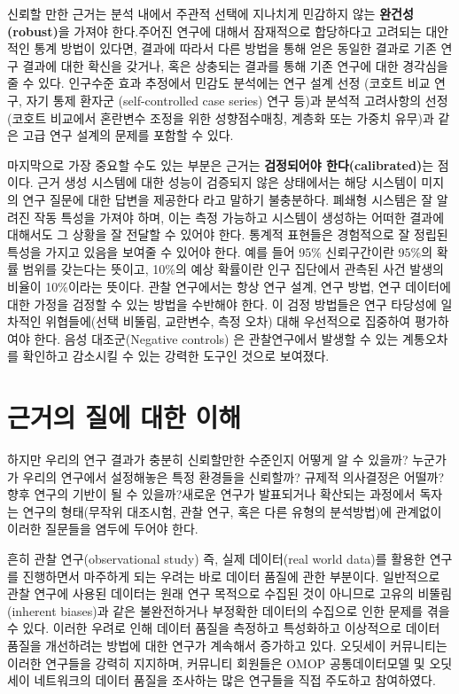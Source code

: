 \documentclass[11pt]{book}
\theoremstyle{definition}
\theoremstyle{definition}
\theoremstyle{definition}
\theoremstyle{remark}
\begin{document}
신뢰할 만한 근거는 분석 내에서 주관적 선택에 지나치게 민감하지 않는
\textbf{완건성(robust)}을 가져야 한다.주어진 연구에 대해서 잠재적으로
합당하다고 고려되는 대안적인 통계 방법이 있다면, 결과에 따라서 다른
방법을 통해 얻은 동일한 결과로 기존 연구 결과에 대한 확신을 갖거나, 혹은
상충되는 결과를 통해 기존 연구에 대한 경각심을 줄 수 있다.
\citep{madigan2013design} 인구수준 효과 추정에서 민감도 분석에는 연구
설계 선정 (코호트 비교 연구, 자기 통제 환자군 (self-controlled case
series) 연구 등)과 분석적 고려사항의 선정 (코호트 비교에서 혼란변수
조정을 위한 성향점수매칭, 계층화 또는 가중치 유무)과 같은 고급 연구
설계의 문제를 포함할 수 있다.

마지막으로 가장 중요할 수도 있는 부분은 근거는 \textbf{검정되어야
한다(calibrated)}는 점이다. 근거 생성 시스템에 대한 성능이 검증되지 않은
상태에서는 해당 시스템이 미지의 연구 질문에 대한 답변을 제공한다 라고
말하기 불충분하다. 폐쇄형 시스템은 잘 알려진 작동 특성을 가져야 하며,
이는 측정 가능하고 시스템이 생성하는 어떠한 결과에 대해서도 그 상황을 잘
전달할 수 있어야 한다. 통계적 표현들은 경험적으로 잘 정립된 특성을
가지고 있음을 보여줄 수 있어야 한다. 예를 들어 95\% 신뢰구간이란 95\%의
확률 범위를 갖는다는 뜻이고, 10\%의 예상 확률이란 인구 집단에서 관측된
사건 발생의 비율이 10\%이라는 뜻이다. 관찰 연구에서는 항상 연구 설계,
연구 방법, 연구 데이터에 대한 가정을 검정할 수 있는 방법을 수반해야
한다. 이 검정 방법들은 연구 타당성에 일차적인 위협들에(선택 비뚤림,
교란변수, 측정 오차) 대해 우선적으로 집중하여 평가하여야 한다. 음성
대조군(Negative controls) 은 관찰연구에서 발생할 수 있는 계통오차를
확인하고 감소시킬 수 있는 강력한 도구인 것으로 보여졌다.
\citep{schuemie_2016, schuemie_2018, schuemie_2018b}

\section{근거의 질에 대한 이해}\label{---}

하지만 우리의 연구 결과가 충분히 신뢰할만한 수준인지 어떻게 알 수
있을까? 누군가가 우리의 연구에서 설정해놓은 특정 환경들을 신뢰할까?
규제적 의사결정은 어떨까? 향후 연구의 기반이 될 수 있을까?새로운 연구가
발표되거나 확산되는 과정에서 독자는 연구의 형태(무작위 대조시험, 관찰
연구, 혹은 다른 유형의 분석방법)에 관계없이 이러한 질문들을 염두에
두어야 한다.  

흔히 관찰 연구(observational study) 즉, 실제 데이터(real world data)를
활용한 연구를 진행하면서 마주하게 되는 우려는 바로 데이터 품질에 관한
부분이다.\citep{botsis2010secondary, hersh2013caveats, sherman2016real}
일반적으로 관찰 연구에 사용된 데이터는 원래 연구 목적으로 수집된 것이
아니므로 고유의 비뚤림(inherent biases)과 같은 불완전하거나 부정확한
데이터의 수집으로 인한 문제를 겪을 수 있다. 이러한 우려로 인해 데이터
품질을 측정하고 특성화하고 이상적으로 데이터 품질을 개선하려는 방법에
대한 연구가 계속해서 증가하고 있다.
\citep{kahn2012pragmatic, liaw2013towards, weiskopf_2013} 오딧세이
커뮤니티는 이러한 연구들을 강력히 지지하며, 커뮤니티 회원들은 OMOP
공통데이터모델 및 오딧세이 네트워크의 데이터 품질을 조사하는 많은
연구들을 직접 주도하고
참여하였다.\citep{huser_multisite_2016, kahn_transparent_2015, callahan2017comparison, yoon_2016}
 
\end{document}
